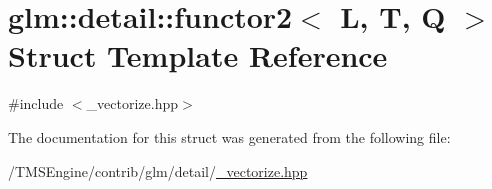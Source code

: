 \hypertarget{structglm_1_1detail_1_1functor2}{}\section{glm\+:\+:detail\+:\+:functor2$<$ L, T, Q $>$ Struct Template Reference}
\label{structglm_1_1detail_1_1functor2}


{\ttfamily \#include $<$\+\_\+vectorize.\+hpp$>$}



The documentation for this struct was generated from the following file\+:\begin{DoxyCompactItemize}
\item 
/\+T\+M\+S\+Engine/contrib/glm/detail/\hyperlink{__vectorize_8hpp}{\+\_\+vectorize.\+hpp}\end{DoxyCompactItemize}
